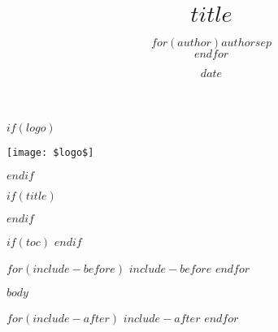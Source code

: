 \documentclass[11pt]{article}
\title{$title$}
\author{$for(author)$$author$$sep$ \\ $endfor$}
\date{$date$}
\date{}
\begin{document}
$if(logo)$
\begin{center}
  \vspace*{6mm}
  \texttt{[image: \$logo\$]}
  \vspace{12mm}
\end{center}
$endif$

$if(title)$
\maketitle
$endif$

$if(toc)$
{
  \hypersetup{linkcolor=black}
  \tableofcontents
  \newpage
}
$endif$

$for(include-before)$
$include-before$
$endfor$

$body$

$for(include-after)$
$include-after$
$endfor$
\end{document}
